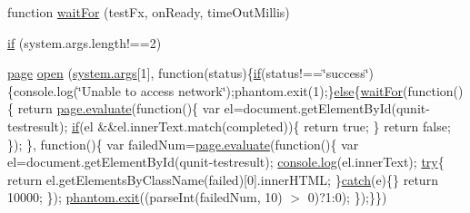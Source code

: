 \begin{DoxyCompactItemize}
\item 
function \hyperlink{run-qunit_8js_a92050644a3b06d4b107af3a767f370b1}{wait\+For} (test\+Fx, on\+Ready, time\+Out\+Millis)
\item 
\hyperlink{run-qunit_8js_a257c1144ed4804cfc7074491c5f634f2}{if} (system.\+args.\+length!==2)
\item 
\hyperlink{waitfor_8js_a85d8b1b97106b359e1c9ee119ebe5832}{page} \hyperlink{run-qunit_8js_a77490009e3f950befc6577188befc461}{open} (\hyperlink{responsive-screenshot_8js_a64e5c861448a80a00f5c93e96de17d7a}{system.\+args}\mbox{[}1\mbox{]}, function(status)\{\hyperlink{sleepsort_8js_a41bc2f4fa2f08e1e174987b1c09445c1}{if}(status!==\char`\"{}success\char`\"{})\{console.\+log(\char`\"{}Unable to access network\char`\"{});phantom.\+exit(1);\}\hyperlink{sleepsort_8js_a0544c3fe466e421738dae463968b70ba}{else}\{\hyperlink{waitfor_8js_a92050644a3b06d4b107af3a767f370b1}{wait\+For}(function()\{                                       return \hyperlink{pagecallback_8js_a63376e151867d7c68f635e19817b9302}{page.\+evaluate}(function()\{                                                       var el=document.\+get\+Element\+By\+Id(\textquotesingle{}qunit-\/testresult\textquotesingle{});                                                       \hyperlink{sleepsort_8js_a41bc2f4fa2f08e1e174987b1c09445c1}{if}(el \&\&el.\+inner\+Text.\+match(\textquotesingle{}completed\textquotesingle{}))\{                                                                       return true;                                                       \}                                                       return false;                                       \});                       \}, function()\{                                       var failed\+Num=\hyperlink{pagecallback_8js_a63376e151867d7c68f635e19817b9302}{page.\+evaluate}(function()\{                                                       var el=document.\+get\+Element\+By\+Id(\textquotesingle{}qunit-\/testresult\textquotesingle{});                                                       \hyperlink{version_8js_a8805635a2f9bf454129d95456a5d317a}{console.\+log}(el.\+inner\+Text);                                                       \hyperlink{echo_to_file_8js_abe4cc9788f52e49485473dc699537388}{try}\{                                                                       return el.\+get\+Elements\+By\+Class\+Name(\textquotesingle{}failed\textquotesingle{})\mbox{[}0\mbox{]}.inner\+H\+T\+ML;                                                       \}\hyperlink{echo_to_file_8js_a5bf45fc51bc0426586792b5f9cb95431}{catch}(e)\{\}                                                       return 10000;                                       \});                                       \hyperlink{version_8js_a01fca00da67a8c60470b440fa7083bf7}{phantom.\+exit}((parse\+Int(failed\+Num, 10) $>$ 0)?1\+:0);                       \});\}\})
\end{DoxyCompactItemize}
